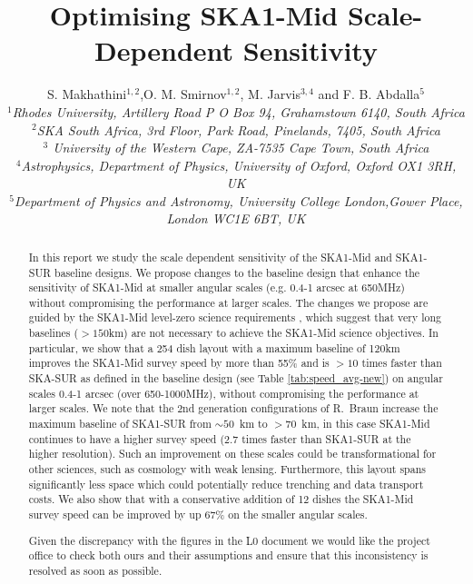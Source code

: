 \documentclass[sfheadings,a4paper,times,9pt,floats,floatfix]{article}
\title{Optimising SKA1-Mid Scale-Dependent Sensitivity}
\author{S. Makhathini$^{1,2}$,O. M. Smirnov$^{1,2}$, M. Jarvis$^{3,4}$ and F. B. Abdalla$^5$ \\{\footnotesize \it $^1$Rhodes
University, Artillery Road P O Box 94, Grahamstown 6140, South Africa} \\{ \footnotesize \it $^2$SKA South Africa, 3rd Floor,
Park Road, Pinelands, 7405, South Africa} \\{\footnotesize \it $^3$ University of the Western Cape, ZA-7535 Cape Town, South
Africa}\\ {\footnotesize \it $^4$Astrophysics, Department of Physics, University of Oxford, Oxford OX1 3RH, UK} \\ {\footnotesize \it $^5$Department of Physics
and Astronomy, University College London,Gower Place, London WC1E 6BT, UK}}
\begin{document}
\maketitle
\begin{abstract}
In this report we study the scale dependent sensitivity of the
SKA1-Mid and SKA1-SUR baseline designs. We propose changes to the baseline
design that enhance the sensitivity of SKA1-Mid at smaller angular scales (e.g. 0.4-1 arcsec at 650MHz) without compromising the performance
at larger scales. The changes we propose are guided by the SKA1-Mid level-zero science requirements \cite{srd}, which suggest that
very long baselines ($>150$km) are not necessary to achieve the SKA1-Mid science objectives. In particular, we show that a 254
dish layout with a maximum baseline of 120km improves the SKA1-Mid survey speed by more than 55\% and is $>10$ times faster than
SKA-SUR as defined in the baseline design (see Table \ref{tab:speed_avg-new}) on angular scales 0.4-1 arcsec (over 650-1000MHz), without compromising the
performance
at larger scales. We note that the 2nd generation configurations of
R.~Braun increase the maximum baseline of SKA1-SUR from $\sim 50$~km
to $>70$~km, in this case SKA1-Mid continues to have a higher survey
speed (2.7 times faster than SKA1-SUR at the higher resolution).
Such an improvement on these scales could be transformational for other sciences, such as cosmology with weak
lensing. Furthermore, this layout spans significantly less space which could potentially reduce trenching and data transport
costs. We also show that with a conservative addition of 12 dishes the SKA1-Mid survey speed can be improved by up 67\% on the
smaller angular scales.

Given the discrepancy with the figures in the L0 document we would
like the project office to check both ours and their assumptions and
ensure that this inconsistency is resolved as soon as possible. 
\end{abstract}
\end{document}
